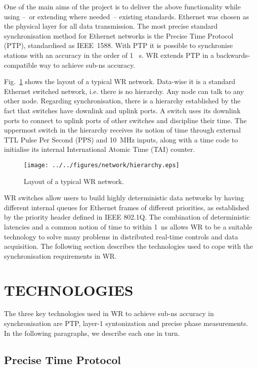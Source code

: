 \documentclass{../JAC2003}
\begin{document}
One of the main aims of the project is to deliver the above
functionality while using --~or extending where needed~-- existing
standards. Ethernet was chosen as the physical layer for all data
transmission. The most precise standard synchronisation method for
Ethernet networks is the Precise Time Protocol (PTP), standardised as
IEEE~1588. With PTP it is possible to synchronise stations with an
accuracy in the order of 1~ \textmu s. WR extends PTP in a
backwards-compatible way to achieve sub-ns accuracy.

Fig.~\ref{hierarchy-fig} shows the layout of a typical WR
network. Data-wise it is a standard Ethernet switched network,
i.e. there is no hierarchy. Any node can talk to any other
node. Regarding synchronisation, there is a hierarchy established by
the fact that switches have downlink and uplink ports. A switch uses
its downlink ports to connect to uplink ports of other switches and
discipline their time. The uppermost switch in the hierarchy receives
its notion of time through external TTL Pulse Per Second (PPS) and
10~MHz inputs, along with a time code to initialise its internal
International Atomic Time (TAI) counter.  

\begin{figure}[htb]
   \centering
   \texttt{[image: ../../figures/network/hierarchy.eps]}
   \caption{Layout of a typical WR network.}
   \label{hierarchy-fig}
\end{figure}

WR switches allow users to build highly deterministic data networks by
having different internal queues for Ethernet frames of different
priorities, as established by the priority header defined in IEEE
802.1Q. The combination of deterministic latencies and a common notion
of time to within 1~ns allows WR to be a suitable technology to solve
many problems in distributed real-time controls and data
acquisition. The following section describes the technologies used to
cope with the synchronisation requirements in WR.

\section{TECHNOLOGIES}

The three key technologies used in WR to achieve sub-ns accuracy in
synchronisation are PTP, layer-1 syntonization and precise phase
measurements. In the following paragraphs, we describe each one in
turn.

\subsection{Precise Time Protocol}
\end{document}
